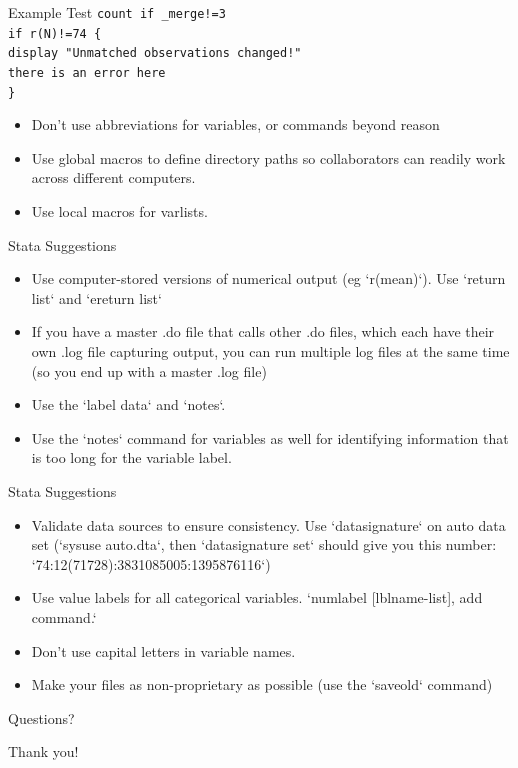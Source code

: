 \documentclass{beamer}
\begin{document}
\begin{frame}{Example Test}
\texttt{count if \_merge!=3 \\ if r(N)!=74 \{ \\ display "Unmatched observations changed!" \\ there is an error here \\  \}   }
\end{frame}
   
\begin{frame}
 \begin{itemize}
\item	Don't use abbreviations for variables, or commands beyond reason
\item	Use global macros to define directory paths so collaborators can readily work across different computers.
\item	Use local macros for varlists.
\end{itemize}
\end{frame}


\begin{frame}{Stata Suggestions}
\begin{itemize}
\item Use computer-stored versions of numerical output (eg `r(mean)`). Use `return list` and `ereturn list`
\item	If you have a master .do file that calls other .do files, which each have their own .log file capturing output, you can run multiple log files at the same time (so you end up with a master .log file)
\item	Use the `label data` and `notes`.
\item	Use the `notes` command for variables as well for identifying information that is too long for the variable label.
\end{itemize}
\end{frame}


\begin{frame}{Stata Suggestions}
\begin{itemize}
\item	Validate data sources to ensure consistency. Use `datasignature` on auto data set (`sysuse auto.dta`, then `datasignature set` should give you this number: `74:12(71728):3831085005:1395876116`) 
\item	Use value labels for all categorical variables. `numlabel [lblname-list], add command.`  
\item	Don't use capital letters in variable names.
\item	Make your files as non-proprietary as possible (use the `saveold` command) 

\end{itemize}
\end{frame}


\begin{frame}
\begin{center}
Questions?
\vspace{1in}


\Huge{Thank you!}
\end{center}
\end{frame}
\end{document}
